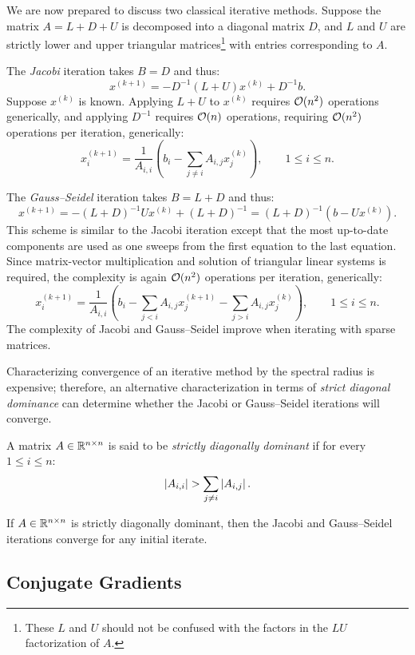 We are now prepared to discuss two classical iterative methods. Suppose the matrix $A = L+D+U$ is decomposed into a diagonal matrix $D$, and $L$ and $U$ are strictly lower and upper triangular matrices\footnote{These $L$ and $U$ should not be confused with the factors in the $LU$ factorization of $A$.} with entries corresponding to $A$.

The {\em Jacobi} iteration takes $B=D$ and thus:
\[
x^{(k+1)} = -D^{-1}(L+U)x^{(k)} + D^{-1}b.
\]
Suppose $x^{(k)}$ is known. Applying $L+U$ to $x^{(k)}$ requires $\mathcal{O}(n^2)$ operations generically, and applying $D^{-1}$ requires $\mathcal{O}(n)$ operations, requiring $\mathcal{O}(n^2)$ operations per iteration, generically:
\[
x_i^{(k+1)} = \dfrac{1}{A_{i,i}}\left(b_i-\sum_{j\ne i}A_{i,j}x_j^{(k)}\right),\qquad 1\le i\le n.
\]

The {\em Gauss--Seidel} iteration takes $B=L+D$ and thus:
\[
x^{(k+1)} = -(L+D)^{-1}Ux^{(k)} + (L+D)^{-1} = (L+D)^{-1}(b-Ux^{(k)}).
\]
This scheme is similar to the Jacobi iteration except that the most up-to-date components are used as one sweeps from the first equation to the last equation. Since matrix-vector multiplication and solution of triangular linear systems is required, the complexity is again $\mathcal{O}(n^2)$ operations per iteration, generically:
\[
x_i^{(k+1)} = \dfrac{1}{A_{i,i}}\left(b_i-\sum_{j< i}A_{i,j}x_j^{(k+1)} - \sum_{j>i}A_{i,j}x_j^{(k)}\right),\qquad 1\le i\le n.
\]
The complexity of Jacobi and Gauss--Seidel improve when iterating with sparse matrices.

Characterizing convergence of an iterative method by the spectral radius is expensive; therefore, an alternative characterization in terms of {\em strict diagonal dominance} can determine whether the Jacobi or Gauss--Seidel iterations will converge.

\begin{definition}
A matrix $A\in\mathbb{R}^{n\times n}$ is said to be {\em strictly diagonally dominant} if for every $1\le i\le n$:
\[
\left|{A_{i,i}}\right| > \sum_{j\ne i} \left|{A_{i,j}}\right|.
\]
\end{definition}

\begin{theorem}\label{theorem:DiagonalDominance}
If $A\in\mathbb{R}^{n\times n}$ is strictly diagonally dominant, then the Jacobi and Gauss--Seidel iterations converge for any initial iterate.
\end{theorem}

\subsection{Conjugate Gradients}

